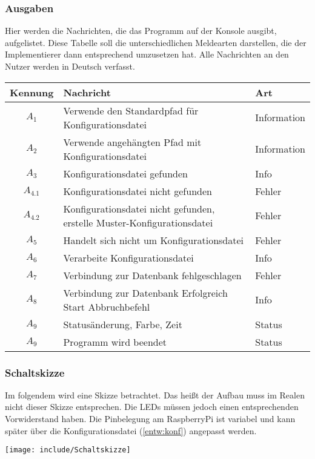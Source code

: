 \subsubsection{Ausgaben}
\label{entw:ausg}
	Hier werden die Nachrichten, die das Programm auf der Konsole ausgibt, aufgelistet. Diese Tabelle soll die unterschiedlichen Meldearten darstellen, die der Implementierer dann entsprechend umzusetzen hat. Alle Nachrichten an den Nutzer werden in Deutsch verfasst. 
\begin{center}
	\begin{tabular}{ | C{.2} | L{.5} | L{.25} | }
	\hline
	Kennung & Nachricht	& Art \\ \hline\hline
	$A_{1}$	& Verwende den Standardpfad für Konfigurationsdatei	& Information	\\ \hline
	$A_{2}$	& Verwende angehängten Pfad mit Konfigurationsdatei	& Information	\\ \hline
	$A_{3}$	& Konfigurationsdatei gefunden	& Info	\\ \hline
	$A_{4.1}$	& Konfigurationsdatei nicht gefunden	& Fehler	\\ \hline
	$A_{4.2}$	& Konfigurationsdatei nicht gefunden, erstelle Muster-Konfigurationsdatei	& Fehler	\\ \hline
	$A_{5}$	& Handelt sich nicht um Konfigurationsdatei	& Fehler	\\ \hline
	$A_{6}$	& Verarbeite Konfigurationsdatei	& Info	\\ \hline
	$A_{7}$	& Verbindung zur Datenbank fehlgeschlagen	& Fehler 	\\ \hline
	$A_{8}$	& Verbindung zur Datenbank	Erfolgreich  Start Abbruchbefehl	& Info	\\ \hline
	$A_{9}$	& Statusänderung, Farbe, Zeit	& Status	\\ \hline
	$A_{9}$	& Programm wird beendet	& Status	\\ \hline	
\end{tabular}
\end{center}

\clearpage
\subsubsection{Schaltskizze}
Im folgendem wird eine Skizze betrachtet. Das  heißt der Aufbau muss im Realen nicht dieser Skizze entsprechen. Die LEDs müssen jedoch einen entsprechenden Vorwiderstand haben. Die Pinbelegung am RaspberryPi ist variabel und kann später über die Konfigurationsdatei (\autoref{entw:konf}) angepasst werden.
\label{entw:schltsk}
\begin{center}
\texttt{[image: include/Schaltskizze]}
\end{center}

